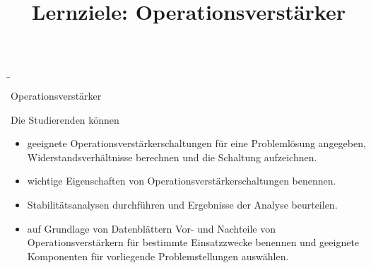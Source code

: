 \begin{frame}
\b{
    \begin{Lernziele}{Operationsverstärker}
        \title{Lernziele: Operationsverstärker}
        Die Studierenden können
        \begin{itemize}
            \item geeignete Operationsverstärkerschaltungen für eine Problemlösung angegeben, Widerstandsverhältnisse berechnen und die Schaltung aufzeichnen.
            \item wichtige Eigenschaften von Operationsverstärkerschaltungen benennen.
            \item Stabilitätsanalysen durchführen und Ergebnisse der Analyse beurteilen.
            \item auf Grundlage von Datenblättern Vor- und Nachteile von Operationsverstärkern für bestimmte Einsatzzwecke benennen und geeignete Komponenten für vorliegende Problemstellungen auswählen.
        \end{itemize}
    \end{Lernziele}    
}
\end{frame}




